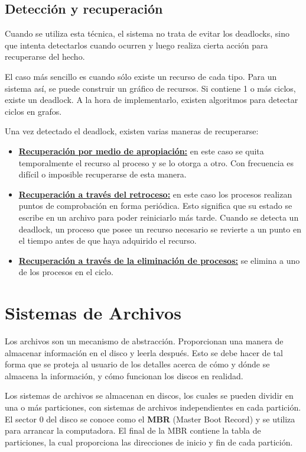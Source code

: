 \subsection{Detección y recuperación}

Cuando se utiliza esta técnica, el sistema no trata de evitar los deadlocks, sino que intenta detectarlos cuando ocurren y luego realiza cierta acción para recuperarse del hecho.

El caso más sencillo es cuando sólo existe un recurso de cada tipo. Para un sistema así, se puede construir un gráfico de recursos. Si contiene 1 o más ciclos, existe un deadlock. A la hora de implementarlo, existen algoritmos para detectar ciclos en grafos.

Una vez detectado el deadlock, existen varias maneras de recuperarse:

\begin{itemize}
\item  \textbf{\underline{Recuperación por medio de apropiación:}} en este caso se quita temporalmente el recurso al proceso y se lo otorga a otro. Con frecuencia es difícil o imposible recuperarse de esta manera.
\item  \textbf{\underline{Recuperación a través del retroceso:}} en este caso los procesos realizan puntos de comprobación en forma periódica. Esto significa que su estado se escribe en un archivo para poder reiniciarlo más tarde. Cuando se detecta un deadlock, un proceso que posee un recurso necesario se revierte a un punto en el tiempo antes de que haya adquirido el recurso.
\item  \textbf{\underline{Recuperación a través de la eliminación de procesos:}} se elimina a uno de los procesos en el ciclo.
\end{itemize}
\newpage


\section{Sistemas de Archivos}

Los archivos son un mecanismo de abstracción. Proporcionan una manera de almacenar información en el disco y leerla después. Esto se debe hacer de tal forma que se proteja al usuario de los detalles acerca de cómo y dónde se almacena la información, y cómo funcionan los discos en realidad.

Los sistemas de archivos se almacenan en discos, los cuales se pueden dividir en una o más particiones, con sistemas de archivos independientes en cada partición. El sector $0$ del disco se conoce como el \textbf{MBR} (Master Boot Record) y se utiliza para arrancar la computadora. El final de la MBR contiene la tabla de particiones, la cual proporciona las direcciones de inicio y fin de cada partición.

